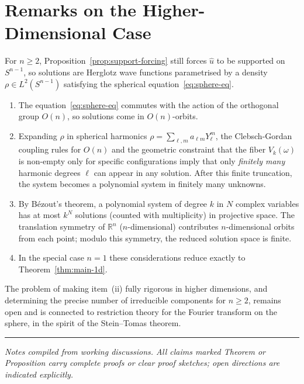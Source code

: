 \documentclass[12pt]{article}
\newcommand{\R}{\mathbb{R}}
\newcommand{\wh}{\widehat}
\begin{document}
\section{Remarks on the Higher-Dimensional Case}

For $n \geq 2$, Proposition~\ref{prop:support-forcing} still forces
$\wh{u}$ to be supported on $S^{n-1}$, so solutions are Herglotz wave
functions parametrised by a density $\rho \in L^2(S^{n-1})$ satisfying
the spherical equation~\eqref{eq:sphere-eq}.

\begin{enumerate}[leftmargin=2em, label=(\roman*)]
  \item The equation~\eqref{eq:sphere-eq} commutes with the action of the
    orthogonal group $O(n)$, so solutions come in $O(n)$-orbits.

  \item Expanding $\rho$ in spherical harmonics
    $\rho = \sum_{\ell,m} a_{\ell m} Y_\ell^m$, the Clebsch-Gordan
    coupling rules for $O(n)$ and the geometric constraint that the fiber
    $V_k(\omega)$ is non-empty only for specific configurations imply that
    only \emph{finitely many} harmonic degrees $\ell$ can appear in any
    solution. After this finite truncation, the system becomes a polynomial
    system in finitely many unknowns.

  \item By Bézout's theorem, a polynomial system of degree $k$ in $N$ complex
    variables has at most $k^N$ solutions (counted with multiplicity) in
    projective space.
    The translation symmetry of $\R^n$ ($n$-dimensional) contributes
    $n$-dimensional orbits from each point; modulo this symmetry, the
    reduced solution space is finite.

  \item In the special case $n=1$ these considerations reduce exactly to
    Theorem~\ref{thm:main-1d}.
\end{enumerate}

\medskip

The problem of making item~(ii) fully rigorous in higher dimensions, and
determining the precise number of irreducible components for $n \geq 2$,
remains open and is connected to restriction theory for the Fourier
transform on the sphere, in the spirit of the Stein--Tomas theorem.

\bigskip
\noindent\rule{\linewidth}{0.4pt}
\begin{center}
  \small\itshape
  Notes compiled from working discussions. All claims marked
  \emph{Theorem} or \emph{Proposition} carry complete proofs or
  clear proof sketches; open directions are indicated explicitly.
\end{center}
\end{document}
